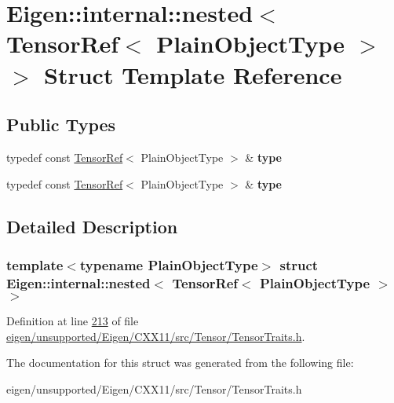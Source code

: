 \hypertarget{struct_eigen_1_1internal_1_1nested_3_01_tensor_ref_3_01_plain_object_type_01_4_01_4}{}\section{Eigen\+:\+:internal\+:\+:nested$<$ Tensor\+Ref$<$ Plain\+Object\+Type $>$ $>$ Struct Template Reference}
\label{struct_eigen_1_1internal_1_1nested_3_01_tensor_ref_3_01_plain_object_type_01_4_01_4}
\subsection*{Public Types}
\begin{DoxyCompactItemize}
\item 
\mbox{\label{struct_eigen_1_1internal_1_1nested_3_01_tensor_ref_3_01_plain_object_type_01_4_01_4_a5995ddb1a00ef95f95852ea24d773a6f}} 
typedef const \hyperlink{class_eigen_1_1_tensor_ref}{Tensor\+Ref}$<$ Plain\+Object\+Type $>$ \& {\bfseries type}
\item 
\mbox{\label{struct_eigen_1_1internal_1_1nested_3_01_tensor_ref_3_01_plain_object_type_01_4_01_4_a5995ddb1a00ef95f95852ea24d773a6f}} 
typedef const \hyperlink{class_eigen_1_1_tensor_ref}{Tensor\+Ref}$<$ Plain\+Object\+Type $>$ \& {\bfseries type}
\end{DoxyCompactItemize}


\subsection{Detailed Description}
\subsubsection*{template$<$typename Plain\+Object\+Type$>$\newline
struct Eigen\+::internal\+::nested$<$ Tensor\+Ref$<$ Plain\+Object\+Type $>$ $>$}



Definition at line \hyperlink{eigen_2unsupported_2_eigen_2_c_x_x11_2src_2_tensor_2_tensor_traits_8h_source_l00213}{213} of file \hyperlink{eigen_2unsupported_2_eigen_2_c_x_x11_2src_2_tensor_2_tensor_traits_8h_source}{eigen/unsupported/\+Eigen/\+C\+X\+X11/src/\+Tensor/\+Tensor\+Traits.\+h}.



The documentation for this struct was generated from the following file\+:\begin{DoxyCompactItemize}
\item 
eigen/unsupported/\+Eigen/\+C\+X\+X11/src/\+Tensor/\+Tensor\+Traits.\+h\end{DoxyCompactItemize}
